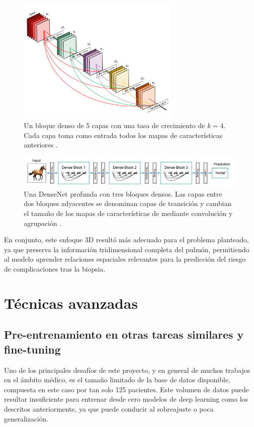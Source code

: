 \begin{figure}[!htbp]
    \centering
    \includegraphics[width=0.7\textwidth]{img/densenet121_2.png}
    \caption{Un bloque denso de 5 capas con una tasa de crecimiento de $k=4$. Cada capa toma como entrada todos los mapas de características anteriores \parencite{huang2017densely}.}
    \label{fig:densenet2}
\end{figure}


\begin{figure}[!htbp]
    \centering
    \includegraphics[width=1\textwidth]{img/densenet121_1.png}
    \caption{Una DenseNet profunda con tres bloques densos. Las capas entre dos bloques adyacentes se denominan capas de transición y cambian el tamaño de los mapas de características de
mediante convolución y agrupación \parencite{huang2017densely}.}
    \label{fig:densenet1}
\end{figure}

En conjunto, este enfoque 3D resultó más adecuado para el problema planteado, ya que preserva la información tridimensional completa del pulmón, permitiendo al modelo aprender relaciones espaciales relevantes para la predicción del riesgo de complicaciones tras la biopsia.

\section{Técnicas avanzadas}

\subsection{Pre-entrenamiento en otras tareas similares y fine-tuning}
Uno de los principales desafíos de este proyecto, y en general de muchos trabajos en el ámbito médico, es el tamaño limitado de la base de datos disponible, compuesta en este caso por tan solo 125 pacientes. Este volumen de datos puede resultar insuficiente para entrenar desde cero modelos de deep learning como los descritos anteriormente, ya que puede conducir al sobreajuste o poca generalización.

